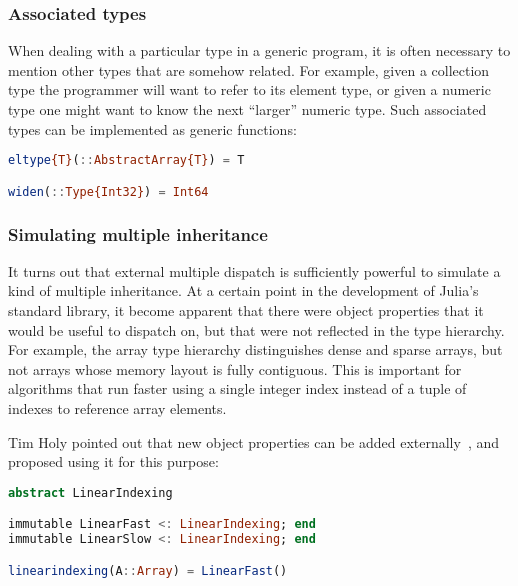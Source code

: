 

\subsubsection{Associated types}

When dealing with a particular type in a generic program, it is often
necessary to mention other types that are somehow related.
For example, given a collection type the programmer will want to
refer to its element type, or given a numeric type one might want to
know the next ``larger'' numeric type.
Such associated types can be implemented as generic functions:

\begin{singlespace}
\begin{lstlisting}[language=julia]
eltype{T}(::AbstractArray{T}) = T

widen(::Type{Int32}) = Int64
\end{lstlisting}
\end{singlespace}

\subsubsection{Simulating multiple inheritance}

It turns out that external multiple dispatch is sufficiently powerful
to simulate a kind of multiple inheritance.
At a certain point in the development of Julia's standard library,
it become apparent that there were object properties that it would be
useful to dispatch on, but that were not reflected in the type hierarchy.
For example, the array type hierarchy distinguishes dense and sparse
arrays, but not arrays whose memory layout is fully contiguous.
This is important for algorithms that run faster using a single
integer index instead of a tuple of indexes to reference array elements.

Tim Holy pointed out that new object properties can be added
externally~\cite{timholytrait}, and proposed using it for this purpose:

\begin{singlespace}
\begin{lstlisting}[language=julia]
abstract LinearIndexing

immutable LinearFast <: LinearIndexing; end
immutable LinearSlow <: LinearIndexing; end

linearindexing(A::Array) = LinearFast()
\end{lstlisting}
\end{singlespace}

